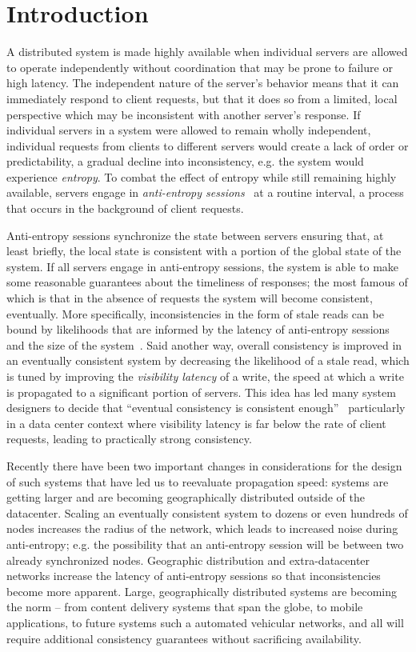 \section*{Introduction}

A distributed system is made highly available when individual servers are
allowed to operate independently without coordination that may be prone to
failure or high latency.
The independent nature of the server's behavior means that it can immediately
respond to client requests, but that it does so from a limited, local
perspective which may be inconsistent with another server's response.
If individual servers in a system were allowed to remain wholly independent,
individual requests from clients to different servers would create a lack of
order or predictability, a gradual decline into inconsistency, e.g. the
system would experience \textit{entropy}.
To combat the effect of entropy while still remaining highly available,
servers engage in \textit{anti-entropy sessions}~\cite{terry_session_1994} at
a routine interval, a process that occurs in the background of client
requests.

Anti-entropy sessions synchronize the state between servers ensuring that,
at least briefly, the local state is consistent with a portion of the global
state of the system.
If all servers engage in anti-entropy sessions, the system is able to make
some reasonable guarantees about the timeliness of responses; the most famous
of which is that in the absence of requests the system will become
consistent, eventually.
More specifically, inconsistencies in the form of stale reads can be bound by
likelihoods that are informed by the latency of anti-entropy sessions and the
size of the system~\cite{bailis_quantifying_2014}.
Said another way, overall consistency is improved in an eventually consistent
system by decreasing the likelihood of a stale read, which is tuned by
improving the \textit{visibility latency} of a write, the speed at which a
write is propagated to a significant portion of servers.
This idea has led many system designers to decide that ``eventual consistency
is consistent enough''~\cite{bermbach_eventual_2011,wada_data_2011}
particularly in a data center context where visibility latency is far below
the rate of client requests, leading to practically strong consistency.

Recently there have been two important changes in considerations for the
design of such systems that have led us to reevaluate propagation speed:
systems are getting larger and are becoming geographically distributed
outside of the datacenter.
Scaling an eventually consistent system to dozens or even hundreds of nodes
increases the radius of the network, which leads to increased noise during
anti-entropy; e.g. the possibility that an anti-entropy session will be
between two already synchronized nodes.
Geographic distribution and extra-datacenter networks increase the latency of
anti-entropy sessions so that inconsistencies become more apparent.
Large, geographically distributed systems are becoming the norm -- from
content delivery systems that span the globe, to mobile applications, to
future systems such a automated vehicular networks, and all will require
additional consistency guarantees without sacrificing availability.

